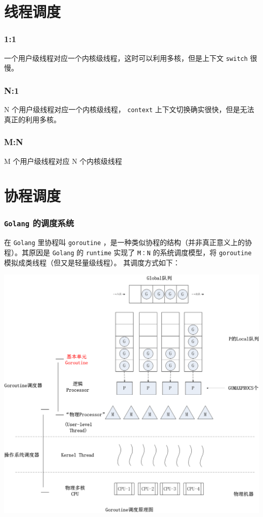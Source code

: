 \documentclass[UTF8]{ctexart}
\begin{document}
\section{线程调度}
\label{sec:orgd11182e}
\subsubsection{1:1}
\label{sec:orga494a8f}
一个用户级线程对应一个内核级线程，这时可以利用多核，但是上下文 \texttt{switch} 很慢。
\subsubsection{N:1}
\label{sec:org1a5e9a9}
N 个用户级线程对应一个内核级线程， \texttt{context} 上下文切换确实很快，但是无法真正的利用多核。
\subsubsection{M:N}
\label{sec:org1b716aa}
M 个用户级线程对应 N 个内核级线程
\section{协程调度}
\label{sec:org52b0610}
\subsubsection{\texttt{Golang} 的调度系统}
\label{sec:org107287f}
    在 \texttt{Golang} 里协程叫 \texttt{goroutine} ，是一种类似协程的结构（并非真正意义上的协程）。其原因是 \texttt{Golang} 的 \texttt{runtime} 实现了 \texttt{M：N} 的系统调度模型，将 \texttt{goroutine} 模拟成类线程（但又是轻量级线程）。
其调度方式如下：

\begin{center}
\includegraphics[width=.9\linewidth]{./goroutine.png}
\end{center}
\end{document}
